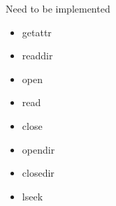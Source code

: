 \documentclass{article}
\begin{document}
Need to be implemented
\begin{itemize}
\item getattr
\item readdir
\item open
\item read
\item close
\item opendir
\item closedir
\item lseek
\end{itemize}
\end{document}
